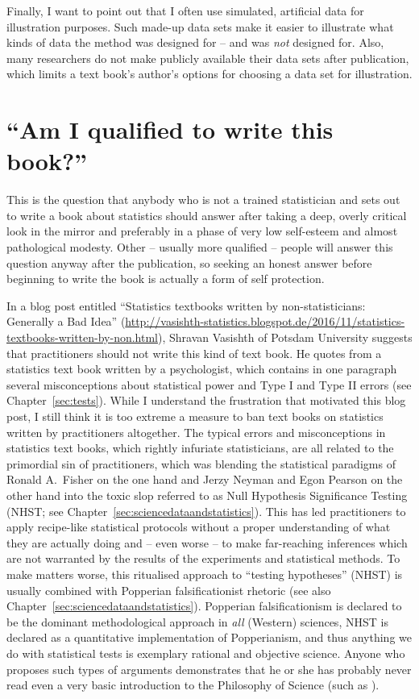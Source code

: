 Finally, I want to point out that I often use simulated, artificial data for illustration purposes.
Such made-up data sets make it easier to illustrate what kinds of data the method was designed for -- and was \textit{not} designed for.
Also, many researchers do not make publicly available their data sets after publication, which limits a text book's author's options for choosing a data set for illustration.


\section*{``Am I qualified to write this book?''}

This is the question that anybody who is not a trained statistician and sets out to write a book about statistics should answer after taking a deep, overly critical look in the mirror and preferably in a phase of very low self-esteem and almost pathological modesty.
Other -- usually more qualified -- people will answer this question anyway after the publication, so seeking an honest answer before beginning to write the book is actually a form of self protection.

In a blog post entitled ``Statistics textbooks written by non-statisticians: Generally a Bad Idea'' (\url{http://vasishth-statistics.blogspot.de/2016/11/statistics-textbooks-written-by-non.html}), Shravan Vasishth of Potsdam University suggests that practitioners should not write this kind of text book. 
He quotes from a statistics text book written by a psychologist, which contains in one paragraph several misconceptions about statistical power and Type I and Type II errors (see Chapter~\ref{sec:tests}).
While I understand the frustration that motivated this blog post, I still think it is too extreme a measure to ban text books on statistics written by practitioners altogether.
The typical errors and misconceptions in statistics text books, which rightly infuriate statisticians, are all related to the primordial sin of practitioners, which was blending the statistical paradigms of Ronald A.\ Fisher on the one hand and Jerzy Neyman and Egon Pearson on the other hand into the toxic slop referred to as Null Hypothesis Significance Testing (NHST; see Chapter~\ref{sec:sciencedataandstatistics}).
This has led practitioners to apply recipe-like statistical protocols without a proper understanding of what they are actually 
doing and -- even worse -- to make far-reaching inferences which are not warranted by the results of the experiments and statistical methods.
To make matters worse, this ritualised approach to ``testing hypotheses'' (NHST) is usually combined with Popperian falsificationist rhetoric (see also Chapter~\ref{sec:sciencedataandstatistics}).
Popperian falsificationism is declared to be the dominant methodological approach in \textit{all} (Western) sciences, NHST is declared as a quantitative implementation of Popperianism, and thus anything we do with statistical tests is exemplary rational and objective science.
Anyone who proposes such types of arguments demonstrates that he or she has probably never read even a very basic introduction to the Philosophy of Science (such as \citealt{Chalmers2013}).

